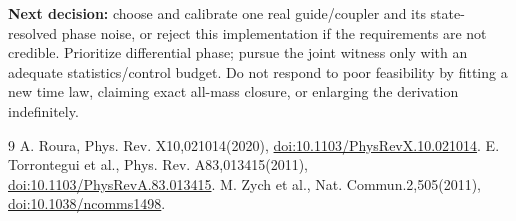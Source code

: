 \documentclass[11pt,a4paper]{article}
\begin{document}
\textbf{Next decision:} choose and calibrate one real guide/coupler and
its state-resolved phase noise, or reject this implementation if the
requirements are not credible. Prioritize differential phase; pursue the
joint witness only with an adequate statistics/control budget. Do not
respond to poor feasibility by fitting a new time law, claiming exact
all-mass closure, or enlarging the derivation indefinitely.

\begin{thebibliography}{9}
 A. Roura, Phys. Rev. X10,021014(2020),
\href{https://doi.org/10.1103/PhysRevX.10.021014}{doi:10.1103/PhysRevX.10.021014}.
 E. Torrontegui et al., Phys. Rev. A83,013415(2011),
\href{https://doi.org/10.1103/PhysRevA.83.013415}{doi:10.1103/PhysRevA.83.013415}.
 M. Zych et al., Nat. Commun.2,505(2011),
\href{https://doi.org/10.1038/ncomms1498}{doi:10.1038/ncomms1498}.
\end{thebibliography}
\end{document}
